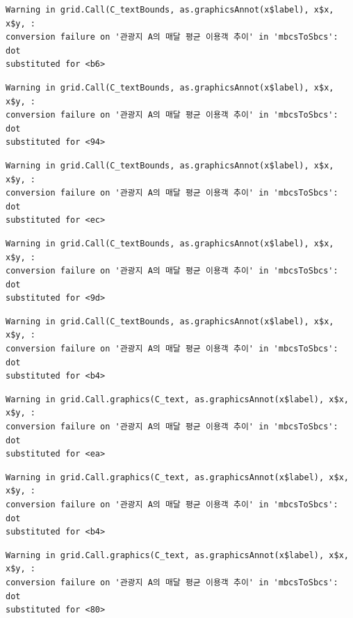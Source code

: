 \documentclass[
  letterpaper,
  DIV=11,
  numbers=noendperiod]{scrreprt}
\begin{document}
\begin{verbatim}
Warning in grid.Call(C_textBounds, as.graphicsAnnot(x$label), x$x, x$y, :
conversion failure on '관광지 A의 매달 평균 이용객 추이' in 'mbcsToSbcs': dot
substituted for <b6>
\end{verbatim}

\begin{verbatim}
Warning in grid.Call(C_textBounds, as.graphicsAnnot(x$label), x$x, x$y, :
conversion failure on '관광지 A의 매달 평균 이용객 추이' in 'mbcsToSbcs': dot
substituted for <94>
\end{verbatim}

\begin{verbatim}
Warning in grid.Call(C_textBounds, as.graphicsAnnot(x$label), x$x, x$y, :
conversion failure on '관광지 A의 매달 평균 이용객 추이' in 'mbcsToSbcs': dot
substituted for <ec>
\end{verbatim}

\begin{verbatim}
Warning in grid.Call(C_textBounds, as.graphicsAnnot(x$label), x$x, x$y, :
conversion failure on '관광지 A의 매달 평균 이용객 추이' in 'mbcsToSbcs': dot
substituted for <9d>
\end{verbatim}

\begin{verbatim}
Warning in grid.Call(C_textBounds, as.graphicsAnnot(x$label), x$x, x$y, :
conversion failure on '관광지 A의 매달 평균 이용객 추이' in 'mbcsToSbcs': dot
substituted for <b4>
\end{verbatim}

\begin{verbatim}
Warning in grid.Call.graphics(C_text, as.graphicsAnnot(x$label), x$x, x$y, :
conversion failure on '관광지 A의 매달 평균 이용객 추이' in 'mbcsToSbcs': dot
substituted for <ea>
\end{verbatim}

\begin{verbatim}
Warning in grid.Call.graphics(C_text, as.graphicsAnnot(x$label), x$x, x$y, :
conversion failure on '관광지 A의 매달 평균 이용객 추이' in 'mbcsToSbcs': dot
substituted for <b4>
\end{verbatim}

\begin{verbatim}
Warning in grid.Call.graphics(C_text, as.graphicsAnnot(x$label), x$x, x$y, :
conversion failure on '관광지 A의 매달 평균 이용객 추이' in 'mbcsToSbcs': dot
substituted for <80>
\end{verbatim}
\end{document}
